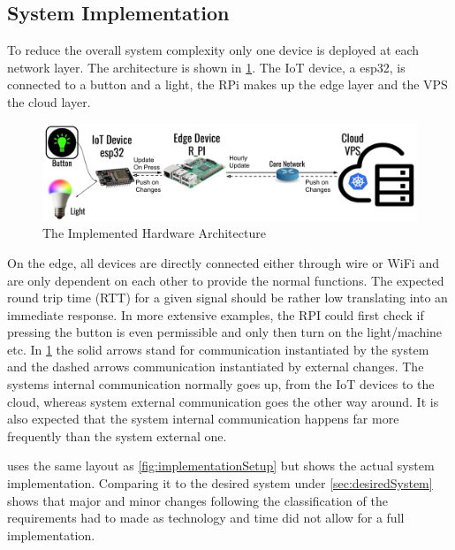 \subsection{System Implementation}
To reduce the overall system complexity only one device is deployed at each network layer. The architecture is shown in \cref{fig:actualSetup}. The IoT device, a esp32, is connected to a button and a light, the RPi makes up the edge layer and the VPS the cloud layer.
\begin{figure}[!ht]
    \centering
    \includegraphics[width=\textwidth]{figures/actualSetup.png}
    \caption{The Implemented Hardware Architecture}
    \label{fig:actualSetup}
\end{figure}
On the edge, all devices are directly connected either through wire or WiFi and are only dependent on each other to provide the normal functions. The expected round trip time (RTT) for a given signal should be rather low translating into an immediate response. In more extensive examples, the RPI could first check if pressing the button is even permissible and only then turn on the light/machine etc. In \cref{fig:actualSetup} the solid arrows stand for communication instantiated by the system and the dashed arrows communication instantiated by external changes. The systems internal communication normally goes up, from the IoT devices to the cloud, whereas system external communication goes the other way around. It is also expected that the system internal communication happens far more frequently than the system external one.

 uses the same layout as \cref{fig:implementationSetup} but shows the actual system implementation. Comparing it to the desired system under \cref{sec:desiredSystem} shows that major and minor changes following the classification of the requirements had to made as technology and time did not allow for a full implementation.

